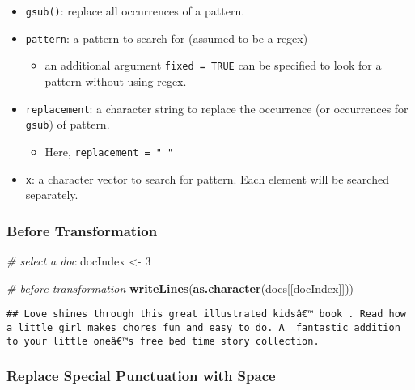 \documentclass[
]{article}
\newenvironment{Shaded}{\begin{snugshade}}{\end{snugshade}}
\newcommand{\CommentTok}[1]{\textcolor[rgb]{0.56,0.35,0.01}{\textit{#1}}}
\newcommand{\DecValTok}[1]{\textcolor[rgb]{0.00,0.00,0.81}{#1}}
\newcommand{\KeywordTok}[1]{\textcolor[rgb]{0.13,0.29,0.53}{\textbf{#1}}}
\newcommand{\NormalTok}[1]{#1}
\newcommand{\StringTok}[1]{\textcolor[rgb]{0.31,0.60,0.02}{#1}}
\providecommand{\tightlist}{%
  \setlength{\itemsep}{0pt}\setlength{\parskip}{0pt}}
\begin{document}
\begin{itemize}
\tightlist
\item
  \texttt{gsub()}: replace all occurrences of a pattern.
\item
  \texttt{pattern}: a pattern to search for (assumed to be a regex)

  \begin{itemize}
  \tightlist
  \item
    an additional argument \texttt{fixed\ =\ TRUE} can be specified to
    look for a pattern without using regex.
  \end{itemize}
\item
  \texttt{replacement}: a character string to replace the occurrence (or
  occurrences for \texttt{gsub}) of pattern.

  \begin{itemize}
  \tightlist
  \item
    Here, \texttt{replacement\ =\ "\ "}
  \end{itemize}
\item
  \texttt{x}: a character vector to search for pattern. Each element
  will be searched separately.
\end{itemize}

\hypertarget{before-transformation}{%
\subsubsection{Before Transformation}\label{before-transformation}}

\begin{Shaded}
\begin{Highlighting}[]
\CommentTok{# select a doc}
\NormalTok{docIndex <-}\StringTok{ }\DecValTok{3}

\CommentTok{# before transformation}
\KeywordTok{writeLines}\NormalTok{(}\KeywordTok{as.character}\NormalTok{(docs[[docIndex]]))}
\end{Highlighting}
\end{Shaded}

\begin{verbatim}
## Love shines through this great illustrated kidsâ€™ book . Read how a little girl makes chores fun and easy to do. A  fantastic addition to your little oneâ€™s free bed time story collection.
\end{verbatim}

\hypertarget{replace-special-punctuation-with-space}{%
\subsubsection{Replace Special Punctuation with
Space}\label{replace-special-punctuation-with-space}}
\end{document}
